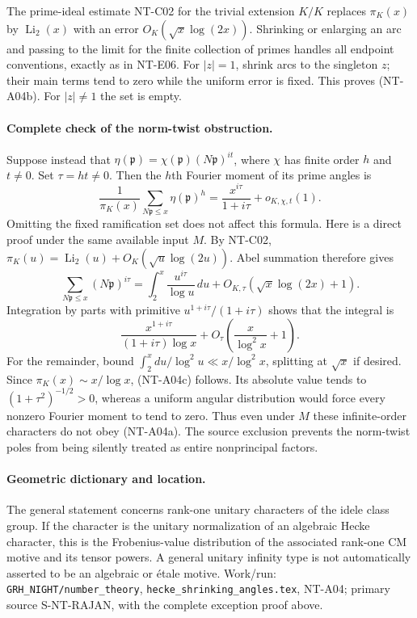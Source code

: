 The prime-ideal estimate NT-C02 for the trivial extension $K/K$
replaces $\pi_K(x)$ by $\operatorname{Li}_2(x)$ with an error
$O_K(\sqrt x\log(2x))$. Shrinking or enlarging an arc and passing
to the limit for the finite collection of primes handles all
endpoint conventions, exactly as in NT-E06. For $|z|=1$, shrink
arcs to the singleton $z$; their main terms tend to zero while the
uniform error is fixed. This proves (NT-A04b). For $|z|\ne1$ the
set is empty.

\paragraph{Complete check of the norm-twist obstruction.}
Suppose instead that $\eta(\mathfrak p)=
\chi(\mathfrak p)(N\mathfrak p)^{it}$, where $\chi$ has finite order
$h$ and $t\ne0$. Set $\tau=ht\ne0$. Then the $h$th Fourier moment
of its prime angles is
\[
 \frac1{\pi_K(x)}\sum_{N\mathfrak p\le x}\eta(\mathfrak p)^h
       =\frac{x^{i\tau}}{1+i\tau}+o_{K,\chi,t}(1).       \tag{NT-A04c}
\]
Omitting the fixed ramification set does not affect this formula.
Here is a direct proof under the same available input $M$.
By NT-C02,
$\pi_K(u)=\operatorname{Li}_2(u)+O_K(\sqrt u\log(2u))$.
Abel summation therefore gives
\[
 \sum_{N\mathfrak p\le x}(N\mathfrak p)^{i\tau}
 =\int_2^x\frac{u^{i\tau}}{\log u}\,du
      +O_{K,\tau}(\sqrt x\log(2x)+1).
\]
Integration by parts with primitive
$u^{1+i\tau}/(1+i\tau)$ shows that the integral is
\[
 \frac{x^{1+i\tau}}{(1+i\tau)\log x}
           +O_\tau\!\left(\frac{x}{\log^2 x}+1\right).
\]
For the remainder, bound
$\int_2^xdu/\log^2u\ll x/\log^2x$, splitting at $\sqrt x$ if
desired. Since $\pi_K(x)\sim x/\log x$, (NT-A04c) follows.
Its absolute value tends to $(1+\tau^2)^{-1/2}>0$, whereas a
uniform angular distribution would force every nonzero Fourier
moment to tend to zero. Thus even under $M$ these infinite-order
characters do not obey (NT-A04a). The source exclusion prevents
the norm-twist poles from being silently treated as entire
nonprincipal factors.

\paragraph{Geometric dictionary and location.}
The general statement concerns rank-one unitary characters of the
idele class group. If the character is the unitary normalization
of an algebraic Hecke character, this is the Frobenius-value
distribution of the associated rank-one CM motive and its tensor
powers. A general unitary infinity type is not automatically
asserted to be an algebraic or \'{e}tale motive.
Work/run: \texttt{GRH\_NIGHT/number\_theory},
\texttt{hecke\_shrinking\_angles.tex}, NT-A04; primary source
S-NT-RAJAN, with the complete exception proof above.

